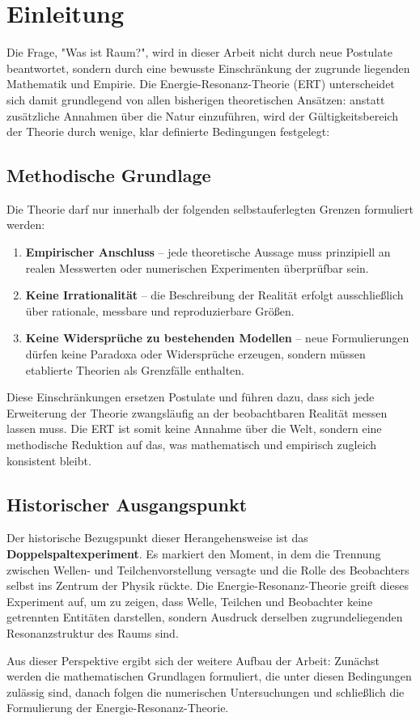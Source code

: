 \chapter{Einleitung}

Die Frage, "Was ist Raum?", wird in dieser Arbeit nicht durch neue Postulate beantwortet, sondern durch eine bewusste Einschränkung der zugrunde liegenden Mathematik und Empirie. 
Die Energie-Resonanz-Theorie (ERT) unterscheidet sich damit grundlegend von allen bisherigen theoretischen Ansätzen: 
anstatt zusätzliche Annahmen über die Natur einzuführen, wird der Gültigkeitsbereich der Theorie durch wenige, klar definierte Bedingungen festgelegt:

\section{Methodische Grundlage}

Die Theorie darf nur innerhalb der folgenden selbstauferlegten Grenzen formuliert werden:

\begin{enumerate}
    \item \textbf{Empirischer Anschluss} – jede theoretische Aussage muss prinzipiell an realen Messwerten oder numerischen Experimenten überprüfbar sein.
    \item \textbf{Keine Irrationalität} – die Beschreibung der Realität erfolgt ausschließlich über rationale, messbare und reproduzierbare Größen.
    \item \textbf{Keine Widersprüche zu bestehenden Modellen} – neue Formulierungen dürfen keine Paradoxa oder Widersprüche erzeugen, sondern müssen etablierte Theorien als Grenzfälle enthalten.
\end{enumerate}

Diese Einschränkungen ersetzen Postulate und führen dazu, dass sich jede Erweiterung der Theorie zwangsläufig an der beobachtbaren Realität messen lassen muss. 
Die ERT ist somit keine Annahme über die Welt, sondern eine methodische Reduktion auf das, was mathematisch und empirisch zugleich konsistent bleibt.

\section{Historischer Ausgangspunkt}

Der historische Bezugspunkt dieser Herangehensweise ist das \textbf{Doppelspaltexperiment}. 
Es markiert den Moment, in dem die Trennung zwischen Wellen- und Teilchenvorstellung versagte und die Rolle des Beobachters selbst ins Zentrum der Physik rückte. 
Die Energie-Resonanz-Theorie greift dieses Experiment auf, um zu zeigen, dass Welle, Teilchen und Beobachter keine getrennten Entitäten darstellen, 
sondern Ausdruck derselben zugrundeliegenden Resonanzstruktur des Raums sind.

Aus dieser Perspektive ergibt sich der weitere Aufbau der Arbeit:
Zunächst werden die mathematischen Grundlagen formuliert, die unter diesen Bedingungen zulässig sind,
danach folgen die numerischen Untersuchungen und schließlich die Formulierung der Energie-Resonanz-Theorie.
